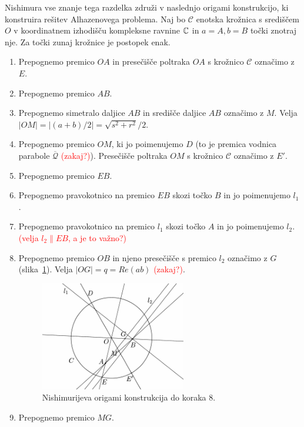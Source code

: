 Nishimura vse znanje tega razdelka združi v naslednjo origami konstrukcijo, ki konstruira rešitev Alhazenovega problema. Naj bo $\mathcal{C}$ enotska krožnica s središčem $O$ v koordinatnem izhodišču kompleksne ravnine $\mathbb C$ in $a = A, b = B$ točki znotraj nje. Za točki zunaj krožnice je postopek enak.
\begin{enumerate}
    \item Prepognemo premico $OA$ in presečišče poltraka $OA$ s krožnico $\mathcal{C}$ označimo z $E$.
    \item Prepognemo premico $AB$.
    \item Prepognemo simetralo daljice $AB$ in središče daljice $AB$ označimo z $M$. Velja $ |OM| = |(a+b)/2| = \sqrt{s^2+r^2}/2$.
    \item Prepognemo premico $OM$, ki jo poimenujemo $D$ (to je premica vodnica parabole $\mathcal{\overline{Q}}$ \textcolor{red}{(zakaj?)}). Presečišče poltraka $OM$ s krožnico $\mathcal{C}$ označimo z $E'$.
    \item Prepognemo premico $EB$.
    \item Prepognemo pravokotnico na premico $EB$ skozi točko $B$ in jo poimenujemo $l_1$.
    \item Prepognemo pravokotnico na premico $l_1$ skozi točko $A$ in jo poimenujemo $l_2$. \textcolor{red}{(velja $l_2 \parallel EB$, a je to važno?)}
    \item Prepognemo premico $OB$ in njeno presečišče s premico $l_2$ označimo z $G$ (slika~\ref{fig:nishimura_origami}). Velja $|OG| = q = Re(ab)$ \textcolor{red}{(zakaj?)}.
    \begin{figure}[h]
        \centering
        \includegraphics[width=0.6\textwidth]{images/alhazen/nishimura_origami.png}
        \caption[Nishimurijeva konstrukcija $1$]{Nishimurijeva origami konstrukcija do koraka $8$.}
        \label{fig:nishimura_origami}
    \end{figure}
    \item Prepognemo premico $MG$.

\end{enumerate}
